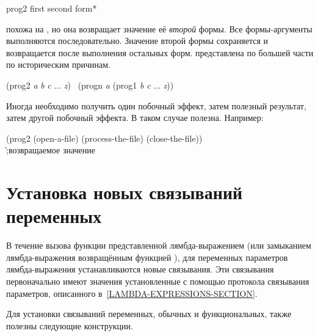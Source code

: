 \begin{defmac}
prog2 first second {form}*

 похожа на , но она возвращает значение её \emph{второй}
формы. Все формы-аргументы выполняются последовательно. Значение второй формы
сохраняется и возвращается после выполнения остальных форм.
 представлена по большей части по историческим причинам.
\begin{lisp}
(prog2 \emph{a} \emph{b} \emph{c} ... \emph{z}) \EQ\ (progn \emph{a} (prog1 \emph{b} \emph{c} ... \emph{z}))
\end{lisp}
Иногда необходимо получить один побочный эффект, затем полезный результат, затем
другой побочный эффекта. В таком случае  полезна.
Например:
\begin{lisp}
(prog2 (open-a-file) (process-the-file) (close-the-file)) \\
\`;\textrm{возвращаемое значение }
\end{lisp}
\end{defmac}

\section{Установка новых связываний переменных}
\label{VAR-BINDING-SECTION}

В течение вызова функции представленной лямбда-выражением (или замыканием
лямбда-выражения возвращённым функцией ),
для переменных параметров лямбда-выражения устанавливаются новые связывания. Эти
связывания первоначально имеют значения установленные с помощью протокола
связывания параметров, описанного в~\ref{LAMBDA-EXPRESSIONS-SECTION}.

Для установки связываний переменных, обычных и функциональных, также полезны
следующие конструкции.

